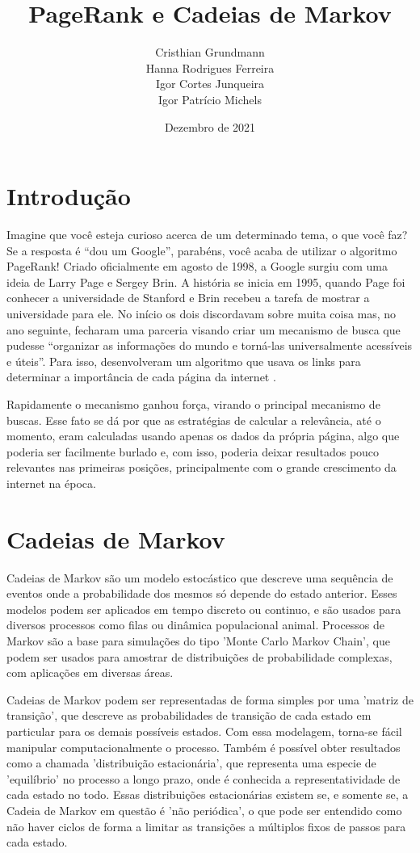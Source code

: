 \documentclass{article}
\title{PageRank e Cadeias de Markov}
\author{Cristhian Grundmann \\
Hanna Rodrigues Ferreira \\
Igor Cortes Junqueira \\
Igor Patrício Michels}
\date{Dezembro de 2021}
\begin{document}
\maketitle

\section*{Introdução}

Imagine que você esteja curioso acerca de um determinado tema, o que você faz? Se a resposta é ``dou um Google'', parabéns, você acaba de utilizar o algoritmo PageRank! Criado oficialmente em agosto de 1998, a Google surgiu com uma ideia de Larry Page e Sergey Brin. A história se inicia em 1995, quando Page foi conhecer a universidade de Stanford e Brin recebeu a tarefa de mostrar a universidade para ele. No início os dois discordavam sobre muita coisa mas, no ano seguinte, fecharam uma parceria visando criar um mecanismo de busca que pudesse ``organizar as informações do mundo e torná-las universalmente acessíveis e úteis''. Para isso, desenvolveram um algoritmo que usava os links para determinar a importância de cada página da internet \cite{google}.

Rapidamente o mecanismo ganhou força, virando o principal mecanismo de buscas. Esse fato se dá por que as estratégias de calcular a relevância, até o momento, eram calculadas usando apenas os dados da própria página, algo que poderia ser facilmente burlado e, com isso, poderia deixar resultados pouco relevantes nas primeiras posições, principalmente com o grande crescimento da internet na época.

\section*{Cadeias de Markov}

Cadeias de Markov são um modelo estocástico que descreve uma sequência de eventos onde a probabilidade dos mesmos só depende do estado anterior. Esses modelos podem ser aplicados em tempo discreto ou continuo, e são usados para diversos processos como filas ou dinâmica populacional animal. Processos de Markov são a base para simulações do tipo 'Monte Carlo Markov Chain', que podem ser usados para amostrar de distribuições de probabilidade complexas, com aplicações em diversas áreas.

Cadeias de Markov podem ser representadas de forma simples por uma 'matriz de transição', que descreve as probabilidades de transição de cada estado em particular para os demais possíveis estados. Com essa modelagem, torna-se fácil manipular computacionalmente o processo. Também é possível obter resultados como a chamada 'distribuição estacionária', que representa uma especie de 'equilíbrio' no processo a longo prazo, onde é conhecida a representatividade de cada estado no todo. Essas distribuições estacionárias existem se, e somente se, a Cadeia de Markov em questão é 'não periódica', o que pode ser entendido como não haver ciclos de forma a limitar as transições a múltiplos fixos de passos para cada estado.
\end{document}
